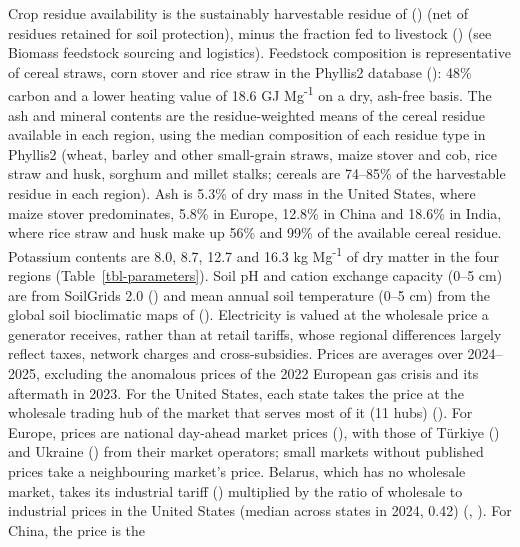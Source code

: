 \documentclass[
  letterpaper,
]{article}
\begin{document}
Crop residue availability is the sustainably harvestable residue of
() (net of residues retained for soil
protection), minus the fraction fed to livestock
() (see Biomass feedstock sourcing
and logistics). Feedstock composition is representative of cereal
straws, corn stover and rice straw in the Phyllis2 database
(): 48\% carbon and a lower heating
value of 18.6 GJ Mg\textsuperscript{-1} on a dry, ash-free basis. The
ash and mineral contents are the residue-weighted means of the cereal
residue available in each region, using the median composition of each
residue type in Phyllis2 (wheat, barley and other small-grain straws,
maize stover and cob, rice straw and husk, sorghum and millet stalks;
cereals are 74--85\% of the harvestable residue in each region). Ash is
5.3\% of dry mass in the United States, where maize stover predominates,
5.8\% in Europe, 12.8\% in China and 18.6\% in India, where rice straw
and husk make up 56\% and 99\% of the available cereal residue.
Potassium contents are 8.0, 8.7, 12.7 and 16.3 kg Mg\textsuperscript{-1}
of dry matter in the four regions (Table~\ref{tbl-parameters}). Soil pH
and cation exchange capacity (0--5 cm) are from SoilGrids 2.0
() and mean annual soil temperature
(0--5 cm) from the global soil bioclimatic maps of
(). Electricity is valued at
the wholesale price a generator receives, rather than at retail tariffs,
whose regional differences largely reflect taxes, network charges and
cross-subsidies. Prices are averages over 2024--2025, excluding the
anomalous prices of the 2022 European gas crisis and its aftermath in
2023. For the United States, each state takes the price at the wholesale
trading hub of the market that serves most of it (11 hubs)
(). For Europe, prices are
national day-ahead market prices
(), with those of Türkiye
() and Ukraine
() from their market
operators; small markets without published prices take a neighbouring
market's price. Belarus, which has no wholesale market, takes its
industrial tariff ()
multiplied by the ratio of wholesale to industrial prices in the United
States (median across states in 2024, 0.42)
(,
). For China, the price is the
\end{document}
